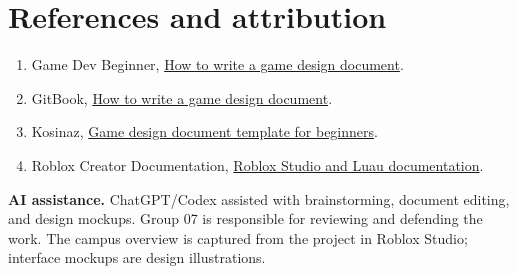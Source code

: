 \section{References and attribution}
\begin{enumerate}
\item Game Dev Beginner, \href{https://gamedevbeginner.com/how-to-write-a-game-design-document-with-examples/}{How to write a game design document}.
\item GitBook, \href{https://www.gitbook.com/blog/how-to-write-a-game-design-document}{How to write a game design document}.
\item Kosinaz, \href{https://github.com/kosinaz/game-design-document-template-for-beginners/blob/master/docs/Game%20Design%20Document.md}{Game design document template for beginners}.
\item Roblox Creator Documentation, \href{https://create.roblox.com/docs}{Roblox Studio and Luau documentation}.
\end{enumerate}
\textbf{AI assistance.} ChatGPT/Codex assisted with brainstorming, document editing, and design mockups. Group 07 is responsible for reviewing and defending the work. The campus overview is captured from the project in Roblox Studio; interface mockups are design illustrations.

